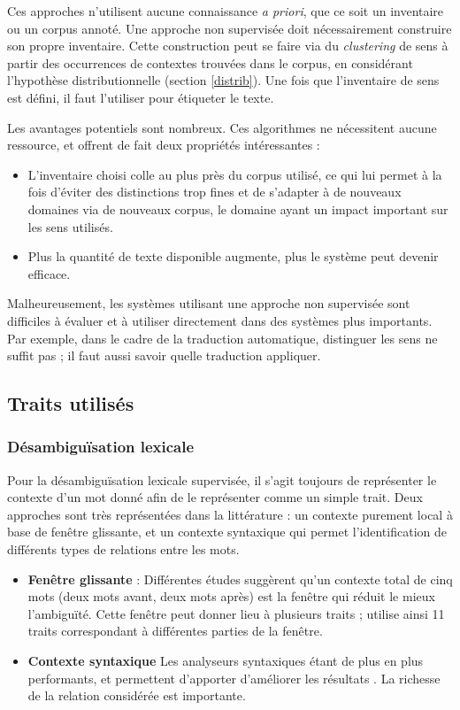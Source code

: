 Ces approches n'utilisent aucune connaissance \textit{a priori}, que ce soit un inventaire ou un corpus annoté. Une approche non supervisée doit nécessairement construire son propre inventaire. Cette construction peut se faire via du \textit{clustering} de sens à partir des occurrences de contextes trouvées dans le corpus, en considérant l'hypothèse distributionnelle (section \ref{distrib}). Une fois que l'inventaire de sens est défini, il faut l'utiliser pour étiqueter le texte.

Les avantages potentiels sont nombreux. Ces algorithmes ne nécessitent aucune ressource, et offrent de fait deux propriétés intéressantes :
\begin{itemize}
    \item L'inventaire choisi colle au plus près du corpus utilisé, ce qui lui permet à la fois d'éviter des distinctions trop fines et de s'adapter à de nouveaux domaines via de nouveaux corpus, le domaine ayant un impact important sur les sens utilisés.
    \item Plus la quantité de texte disponible augmente, plus le système peut devenir efficace.
\end{itemize}

Malheureusement, les systèmes utilisant une approche non supervisée sont difficiles à évaluer et à utiliser directement dans des systèmes plus importants. Par exemple, dans le cadre de la traduction automatique, distinguer les sens ne suffit pas ; il faut aussi savoir quelle traduction appliquer.

\subsection{Traits utilisés}

\subsubsection{Désambiguïsation lexicale}

Pour la désambiguïsation lexicale supervisée, il s'agit toujours de représenter le contexte d'un mot donné afin de le représenter comme un simple trait. Deux approches sont très représentées dans la littérature : un contexte purement local à base de fenêtre glissante, et un contexte syntaxique qui permet l'identification de différents types de relations entre les mots.
\begin{itemize}
    \item \textbf{Fenêtre glissante} : Différentes études \citep{kaplan1955experimental,choueka1985disambiguation,karlgren2001from,kohomban2005learning,dinu2007sometimes} suggèrent qu'un contexte total de cinq mots (deux mots avant, deux mots après) est la fenêtre qui réduit le mieux l'ambiguïté. Cette fenêtre peut donner lieu à plusieurs traits ; \cite{chan2007nus} utilise ainsi 11 traits correspondant à différentes parties de la fenêtre.
    \item \textbf{Contexte syntaxique} Les analyseurs syntaxiques étant de plus en plus performants, et permettent d'apporter d'améliorer les résultats \citep{martinez2002syntactic}. La richesse de la relation considérée est importante.
\end{itemize}

